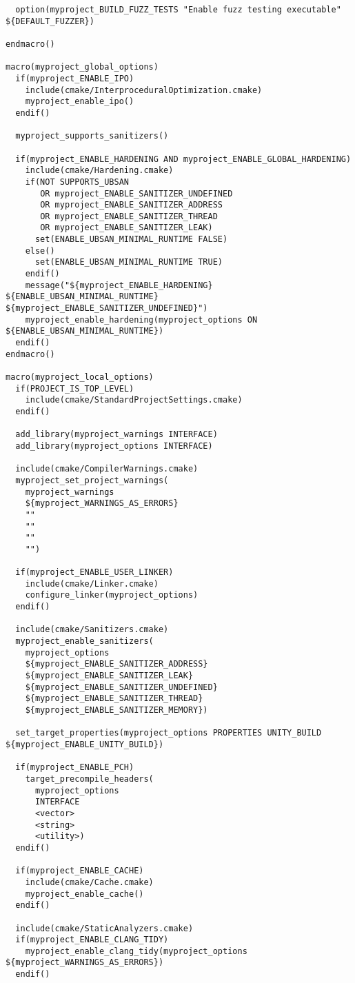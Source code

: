 \begin{verbatim}
  option(myproject_BUILD_FUZZ_TESTS "Enable fuzz testing executable" ${DEFAULT_FUZZER})

endmacro()

macro(myproject_global_options)
  if(myproject_ENABLE_IPO)
    include(cmake/InterproceduralOptimization.cmake)
    myproject_enable_ipo()
  endif()

  myproject_supports_sanitizers()

  if(myproject_ENABLE_HARDENING AND myproject_ENABLE_GLOBAL_HARDENING)
    include(cmake/Hardening.cmake)
    if(NOT SUPPORTS_UBSAN 
       OR myproject_ENABLE_SANITIZER_UNDEFINED
       OR myproject_ENABLE_SANITIZER_ADDRESS
       OR myproject_ENABLE_SANITIZER_THREAD
       OR myproject_ENABLE_SANITIZER_LEAK)
      set(ENABLE_UBSAN_MINIMAL_RUNTIME FALSE)
    else()
      set(ENABLE_UBSAN_MINIMAL_RUNTIME TRUE)
    endif()
    message("${myproject_ENABLE_HARDENING} ${ENABLE_UBSAN_MINIMAL_RUNTIME} ${myproject_ENABLE_SANITIZER_UNDEFINED}")
    myproject_enable_hardening(myproject_options ON ${ENABLE_UBSAN_MINIMAL_RUNTIME})
  endif()
endmacro()

macro(myproject_local_options)
  if(PROJECT_IS_TOP_LEVEL)
    include(cmake/StandardProjectSettings.cmake)
  endif()

  add_library(myproject_warnings INTERFACE)
  add_library(myproject_options INTERFACE)

  include(cmake/CompilerWarnings.cmake)
  myproject_set_project_warnings(
    myproject_warnings
    ${myproject_WARNINGS_AS_ERRORS}
    ""
    ""
    ""
    "")

  if(myproject_ENABLE_USER_LINKER)
    include(cmake/Linker.cmake)
    configure_linker(myproject_options)
  endif()

  include(cmake/Sanitizers.cmake)
  myproject_enable_sanitizers(
    myproject_options
    ${myproject_ENABLE_SANITIZER_ADDRESS}
    ${myproject_ENABLE_SANITIZER_LEAK}
    ${myproject_ENABLE_SANITIZER_UNDEFINED}
    ${myproject_ENABLE_SANITIZER_THREAD}
    ${myproject_ENABLE_SANITIZER_MEMORY})

  set_target_properties(myproject_options PROPERTIES UNITY_BUILD ${myproject_ENABLE_UNITY_BUILD})

  if(myproject_ENABLE_PCH)
    target_precompile_headers(
      myproject_options
      INTERFACE
      <vector>
      <string>
      <utility>)
  endif()

  if(myproject_ENABLE_CACHE)
    include(cmake/Cache.cmake)
    myproject_enable_cache()
  endif()

  include(cmake/StaticAnalyzers.cmake)
  if(myproject_ENABLE_CLANG_TIDY)
    myproject_enable_clang_tidy(myproject_options ${myproject_WARNINGS_AS_ERRORS})
  endif()


\end{verbatim}
